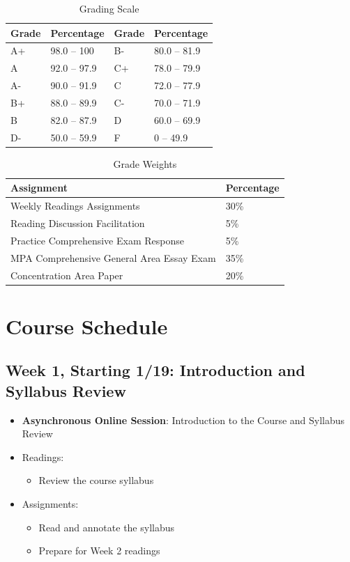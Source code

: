 \documentclass[12pt, letterpaper]{article}
\begin{document}
\begin{table}[h]
\centering
\caption{Grading Scale}
\begin{tabular}{llll}
\toprule
\textbf{Grade} & \textbf{Percentage} & \textbf{Grade} & \textbf{Percentage} \\
\midrule
A+ & 98.0 -- 100 & B- & 80.0 -- 81.9\\
A & 92.0 -- 97.9 & C+ & 78.0 -- 79.9\\
A- & 90.0 -- 91.9 & C & 72.0 -- 77.9\\
B+ & 88.0 -- 89.9 & C- & 70.0 -- 71.9\\
B & 82.0 -- 87.9 & D & 60.0 -- 69.9\\
D- & 50.0 -- 59.9 & F & 0 -- 49.9\\

\bottomrule
\end{tabular}
\label{tab:grading-scale}
\end{table}

\begin{table}[h!]
    \centering
    \caption{Grade Weights}
    \begin{tabular}{ll}
        \toprule
    \textbf{Assignment} & \textbf{Percentage} \\
    \midrule
    Weekly Readings Assignments & 30\% \\
    Reading Discussion Facilitation & 5\% \\
    Practice Comprehensive Exam Response & 5\% \\
    MPA Comprehensive General Area Essay Exam & 35\% \\
    Concentration Area Paper & 20\% \\
    \bottomrule
    \end{tabular}
    \label{tab:grade-weights}
\end{table}

\section{Course Schedule}

\subsection*{Week 1, Starting 1/19: Introduction and Syllabus Review}
\begin{itemize}
    \item \textbf{Asynchronous Online Session}: Introduction to the Course and Syllabus Review
    \item Readings:
        \begin{itemize}
            \item Review the course syllabus
        \end{itemize}
    \item Assignments:
        \begin{itemize}
            \item Read and annotate the syllabus
            \item Prepare for Week 2 readings
        \end{itemize}
\end{itemize}
\end{document}
